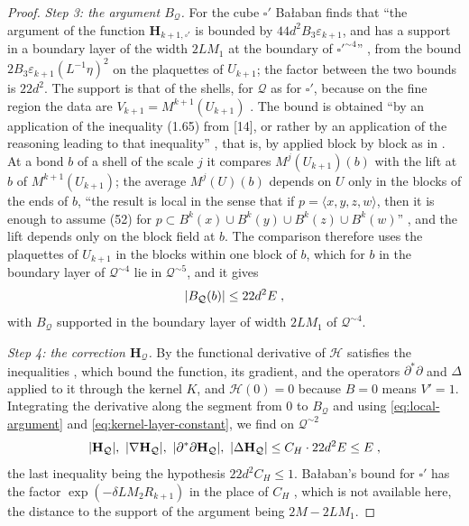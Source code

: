 \documentclass[11pt]{preprint}
\DeclarePairedDelimiter{\abs}{\lvert}{\rvert}
\numberwithin{equation}{section}
\theoremstyle{definition}
\theoremstyle{remark}
\theoremstyle{plain}
\begin{document}
\begin{proof}
\emph{Step 3: the argument $B_{\mathcal Q}$.} For the cube $\square'$ Ba{\l}aban finds that ``the argument of the function $\mathbf H_{k+1,\square'}$ is bounded by $44d^2B_3\varepsilon_{k+1}$, and has a support in a boundary layer of the width $2LM_1$ at the boundary of $\square'^{\sim4}$'' \cite[p.~268]{BalabanCRE}, from the bound $2B_3\varepsilon_{k+1}(L^{-1}\eta)^2$ on the plaquettes of $U_{k+1}$; the factor between the two bounds is $22d^2$. The support is that of the shells, for $\mathcal Q$ as for $\square'$, because on the fine region the data are $V_{k+1} = M^{k+1}(U_{k+1})$ \cite[p.~267]{BalabanCRE}. The bound is obtained ``by an application of the inequality (1.65) from [14], or rather by an application of the reasoning leading to that inequality'' \cite[p.~266]{BalabanCRE}, that is, by \cite[Lemma~1, (1.24)--(1.25), p.~79]{BalabanREG} applied block by block as in \cite[(1.65), p.~87]{BalabanREG}. At a bond $b$ of a shell of the scale $j$ it compares $M^j(U_{k+1})(b)$ with the lift at $b$ of $M^{k+1}(U_{k+1})$; the average $M^j(U)(b)$ depends on $U$ only in the blocks of the ends of $b$, ``the result is local in the sense that if $p = \langle x, y, z, w\rangle$, then it is enough to assume (52) for $p \subset B^k(x) \cup B^k(y) \cup B^k(z) \cup B^k(w)$'' \cite[Proposition~2, p.~26]{BalabanAVG}, and the lift depends only on the block field at $b$. The comparison therefore uses the plaquettes of $U_{k+1}$ in the blocks within one block of $b$, which for $b$ in the boundary layer of $\mathcal Q^{\sim4}$ lie in $\mathcal Q^{\sim5}$, and it gives
\begin{equation}\label{eq:local-argument}
    \abs{B_{\mathcal Q}(b)} \leq 22d^2E\;,
\end{equation}
with $B_{\mathcal Q}$ supported in the boundary layer of width $2LM_1$ of $\mathcal Q^{\sim4}$.

\emph{Step 4: the correction $\mathbf H_{\mathcal Q}$.} By \cite[Proposition~9]{BalabanVAR} the functional derivative of $\mathscr H$ satisfies the inequalities \cite[(190)]{BalabanVAR}, which bound the function, its gradient, and the operators $\partial^*\partial$ and $\Delta$ applied to it through the kernel $K$, and $\mathscr H(0) = 0$ because $B = 0$ means $V' = 1$. Integrating the derivative along the segment from $0$ to $B_{\mathcal Q}$ and using \eqref{eq:local-argument} and \eqref{eq:kernel-layer-constant}, we find on $\mathcal Q^{\sim2}$
\begin{equation}\label{eq:local-correction}
    \abs{\mathbf H_{\mathcal Q}},\ \abs{\nabla\mathbf H_{\mathcal Q}},\ \abs{\partial^*\partial\mathbf H_{\mathcal Q}},\ \abs{\Delta\mathbf H_{\mathcal Q}} \leq C_H \cdot 22d^2E \leq E\;,
\end{equation}
the last inequality being the hypothesis $22d^2C_H \leq 1$. Ba{\l}aban's bound for $\square'$ has the factor $\exp(-\delta LM_2R_{k+1})$ in the place of $C_H$ \cite[p.~268]{BalabanCRE}, which is not available here, the distance to the support of the argument being $2M - 2LM_1$.


\end{proof}
\end{document}
